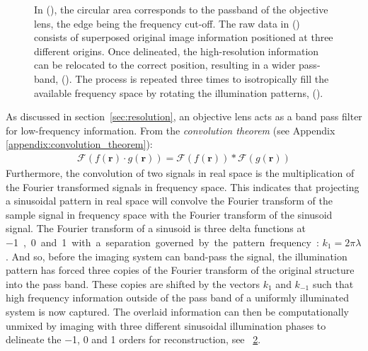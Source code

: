 \begin{figure}
\begin{subfigure}[t]{0.1\textwidth}
        \label{fig:sim_coordinates}
    \end{subfigure}
    \hfill
    \caption{
        In (), the circular area corresponds to the passband of the \gls{objective lens}, the edge being the frequency cut-off.
        The raw data in () consists of superposed original image information
        positioned at three different origins.
        Once delineated, the high-resolution information can be relocated to the correct position, resulting in a wider pass-band, ().
        The process is repeated three times to isotropically fill the available frequency space by rotating the illumination patterns, ().
        }
    \label{fig:sim_flowers}
\end{figure}

As discussed in section~\ref{sec:resolution}, an \gls{objective lens} acts as a band pass filter for low-frequency information.
From the \emph{\Gls{convolution theorem}} (see Appendix \ref{appendix:convolution_theorem}):
\begin{align}
  \mathcal{F} (f(\mathbf{r}) \cdot g(\mathbf{r})) = \mathcal{F}(f(\mathbf{r})) * \mathcal{F}(g(\mathbf{r}))
\end{align}
Furthermore, the convolution of two signals in real space is the multiplication of the Fourier transformed signals in frequency space.
This indicates that projecting a sinusoidal pattern in real space will convolve the Fourier transform of the sample signal in frequency space with the Fourier transform of the sinusoid signal.
The Fourier transform of a sinusoid is three delta functions at \SI{-1}, \SI{0} and \SI{+1} with a separation governed by the pattern frequency: $k_1 = {2\pi}{\lambda}$.
And so, before the imaging system can band-pass the signal, the illumination pattern has forced three copies of the Fourier transform of the original structure into the pass band.
These copies are shifted by the vectors $k_1$ and $k_{-1}$ such that high frequency information outside of the pass band of a uniformly illuminated system is now captured. %
The overlaid information can then be computationally unmixed by imaging with three different sinusoidal illumination phases to delineate the \SI{-1}{}, \SI{0}{} and \SI{+1}{} orders for reconstruction, see \figurename~\ref{fig:sim_flowers}.


